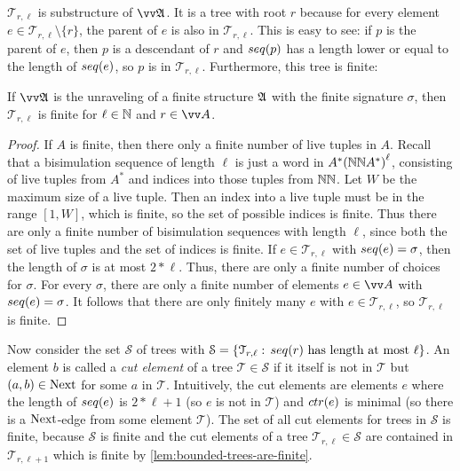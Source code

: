 \noindent
$\mathcal{T}_{r,\ell}$ is substructure of $\unravel{A}$.
It is a tree with root $r$ because for every element $e \in \mathcal{T}_{r,\ell} \setminus \{r\}$, the parent of $e$ is also in $\mathcal{T}_{r,\ell}$.
This is easy to see: if $p$ is the parent of $e$, then $p$ is a descendant of $r$ and $\seq{p}$ has a length lower or equal to the length of $\seq{e}$, so $p$ is in $\mathcal{T}_{r,\ell}$.
Furthermore, this tree is finite:
\begin{lemma}\label{lem:bounded-trees-are-finite}
  If $\unravel{A}$ is the unraveling of a finite structure ${\mathfrak{A}}$ with the finite signature $\sigma$, then $\mathcal{T}_{r,\ell}$ is finite for $\ell \in {\mathbb{N}}$ and $r \in \unraveldom{A}$.
\end{lemma}
\begin{proof}
If $A$ is finite, then there only a finite number of live tuples in $A$.
Recall that a bisimulation sequence of length $\ell$ is just a word in $A^*{({\mathbb{N}}{\mathbb{N}}{}A^{*})}^{\ell}$, consisting of live tuples from $A^{*}$ and indices into those tuples from ${\mathbb{N}}{\mathbb{N}}$.
Let $W$ be the maximum size of a live tuple.
Then an index into a live tuple must be in the range $[1,W]$, which is finite, so the set of possible indices is finite.
Thus there are only a finite number of bisimulation sequences with length $\ell$, since both the set of live tuples and the set of indices is finite.
If $e \in \mathcal{T}_{r,\ell}$ with $\seq{e} = \sigma$, then the length of $\sigma$ is at most $2 * \ell$.
Thus, there are only a finite number of choices for $\sigma$.
For every $\sigma$, there are only a finite number of elements $e \in \unraveldom{A}$ with $\seq{e} = \sigma$.
It follows that there are only finitely many $e$ with $e \in \mathcal{T}_{r,\ell}$, so $\mathcal{T}_{r,\ell}$ is finite.
\end{proof}
Now consider the set $\mathcal{S}$ of trees with $\mathcal{S} = \left\{ \mathcal{T}_{r,\ell}:\, \seq{r}\ \text{has length at most $\ell$}\right\}$.
An element $b$ is called a \emph{cut element} of a tree $\mathcal{T} \in \mathcal{S}$ if it itself is not in $\mathcal{T}$ but $(a,b) \in \mathrm{Next}$ for some $a$ in $\mathcal{T}$.
Intuitively, the cut elements are elements $e$ where the length of $\seq{e}$ is $2 * \ell + 1$ (so $e$ is not in $\mathcal{T}$) and $\ctr{e}$ is minimal (so there is a $\mathrm{Next}$-edge from some element $\mathcal{T}$).
The set of all cut elements for trees in $\mathcal{S}$ is finite, because $\mathcal{S}$ is finite and the cut elements of a tree $\mathcal{T}_{r,\ell} \in \mathcal{S}$ are contained in $\mathcal{T}_{r,\ell+1}$ which is finite by \cref{lem:bounded-trees-are-finite}.
